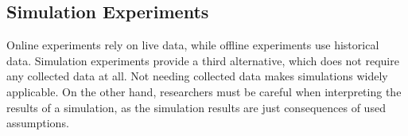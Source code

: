 %
%
%

\subsection{Simulation Experiments}

Online experiments rely on live data,
while offline experiments use historical data.
Simulation experiments provide a third alternative,
  which does not require any collected data at all.
Not needing collected data makes simulations widely applicable.
On the other hand, researchers must be careful when interpreting
  the results of a simulation, as the simulation results are %
  just consequences of used assumptions.

